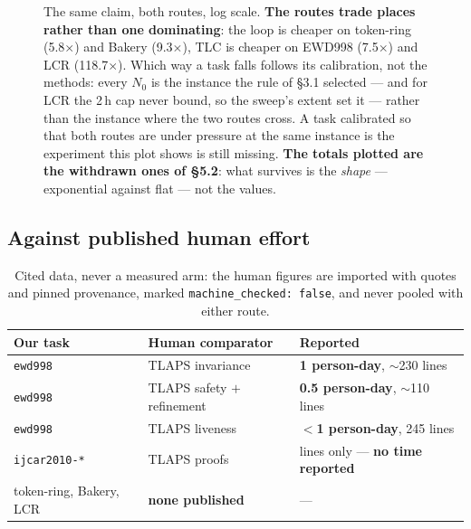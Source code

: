 \documentclass[11pt,a4paper]{article}
\begin{document}
\begin{figure}[htbp]
\centering
{}
\caption{The same claim, both routes, log scale. \textbf{The routes trade places rather than one
dominating}: the loop is cheaper on token-ring (5.8$\times$) and Bakery (9.3$\times$), TLC is cheaper on
EWD998 (7.5$\times$) and LCR (118.7$\times$). Which way a task falls follows its calibration, not the
methods: every $N_0$ is the instance the rule of \S3.1 selected --- and for LCR the 2\,h cap never bound,
so the sweep's extent set it --- rather than the instance where the two routes cross. A task calibrated
so that both routes are under pressure at the same instance is the experiment this plot shows is still
missing. \textbf{The totals plotted are the withdrawn ones of \S5.2}: what survives is the \emph{shape}
--- exponential against flat --- not the values.}
\end{figure}

\subsection{Against published human effort}

\begin{table}[htbp]
\centering
\small
\begin{tabular}{@{}lll@{}}
\toprule
Our task & Human comparator & Reported \\
\midrule
\texttt{ewd998} & TLAPS invariance & \textbf{1 person-day}, $\sim$230 lines \\
\texttt{ewd998} & TLAPS safety $+$ refinement & \textbf{0.5 person-day}, $\sim$110 lines \\
\texttt{ewd998} & TLAPS liveness & \textbf{$<$1 person-day}, 245 lines \\
\texttt{ijcar2010-*} & TLAPS proofs & lines only --- \textbf{no time reported} \\
token-ring, Bakery, LCR & \textbf{none published} & --- \\
\bottomrule
\end{tabular}
\caption{Cited data, never a measured arm: the human figures are imported with quotes and pinned
provenance, marked \texttt{machine\_checked: false}, and never pooled with either route.}
\end{table}
\end{document}
